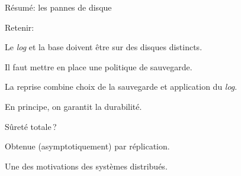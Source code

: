 \documentclass[aspectratio=169, handout]{beamer} %
\begin{document}
\begin{frame}{Résumé: les pannes de disque}

Retenir:

\vfill

\begin{redbullet}

  \item Le \textit{log} et la base doivent être sur des disques distincts.
  
  
  \item Il faut mettre en place une politique de sauvegarde.
 
 \item La reprise combine choix de la sauvegarde et application du \textit{log}.
 \end{redbullet}

\vfill

En principe, on \alert{garantit} la durabilité.
\vfill

\alert{Sûreté totale}\,? 

\begin{blocgauche}
\begin{redbullet}

  \item  Obtenue (asymptotiquement)
par \alert{réplication}. 

\item Une des motivations des systèmes distribués.
\end{redbullet}
\end{blocgauche}
\vfill
{}

\end{frame}
\end{document}
